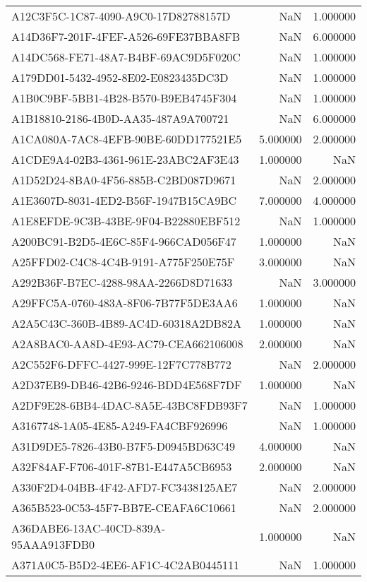 \begin{tabular}{lrr}
A12C3F5C-1C87-4090-A9C0-17D82788157D & NaN & 1.000000 \\
A14D36F7-201F-4FEF-A526-69FE37BBA8FB & NaN & 6.000000 \\
A14DC568-FE71-48A7-B4BF-69AC9D5F020C & NaN & 1.000000 \\
A179DD01-5432-4952-8E02-E0823435DC3D & NaN & 1.000000 \\
A1B0C9BF-5BB1-4B28-B570-B9EB4745F304 & NaN & 1.000000 \\
A1B18810-2186-4B0D-AA35-487A9A700721 & NaN & 6.000000 \\
A1CA080A-7AC8-4EFB-90BE-60DD177521E5 & 5.000000 & 2.000000 \\
A1CDE9A4-02B3-4361-961E-23ABC2AF3E43 & 1.000000 & NaN \\
A1D52D24-8BA0-4F56-885B-C2BD087D9671 & NaN & 2.000000 \\
A1E3607D-8031-4ED2-B56F-1947B15CA9BC & 7.000000 & 4.000000 \\
A1E8EFDE-9C3B-43BE-9F04-B22880EBF512 & NaN & 1.000000 \\
A200BC91-B2D5-4E6C-85F4-966CAD056F47 & 1.000000 & NaN \\
A25FFD02-C4C8-4C4B-9191-A775F250E75F & 3.000000 & NaN \\
A292B36F-B7EC-4288-98AA-2266D8D71633 & NaN & 3.000000 \\
A29FFC5A-0760-483A-8F06-7B77F5DE3AA6 & 1.000000 & NaN \\
A2A5C43C-360B-4B89-AC4D-60318A2DB82A & 1.000000 & NaN \\
A2A8BAC0-AA8D-4E93-AC79-CEA662106008 & 2.000000 & NaN \\
A2C552F6-DFFC-4427-999E-12F7C778B772 & NaN & 2.000000 \\
A2D37EB9-DB46-42B6-9246-BDD4E568F7DF & 1.000000 & NaN \\
A2DF9E28-6BB4-4DAC-8A5E-43BC8FDB93F7 & NaN & 1.000000 \\
A3167748-1A05-4E85-A249-FA4CBF926996 & NaN & 1.000000 \\
A31D9DE5-7826-43B0-B7F5-D0945BD63C49 & 4.000000 & NaN \\
A32F84AF-F706-401F-87B1-E447A5CB6953 & 2.000000 & NaN \\
A330F2D4-04BB-4F42-AFD7-FC3438125AE7 & NaN & 2.000000 \\
A365B523-0C53-45F7-BB7E-CEAFA6C10661 & NaN & 2.000000 \\
A36DABE6-13AC-40CD-839A-95AAA913FDB0 & 1.000000 & NaN \\
A371A0C5-B5D2-4EE6-AF1C-4C2AB0445111 & NaN & 1.000000 \\

\end{tabular}
